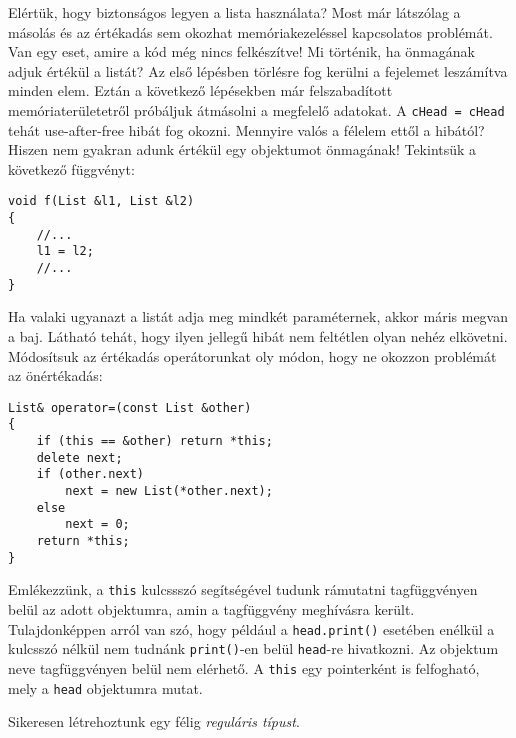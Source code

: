 \documentclass[a4paper,11.5pt,table]{article}
\begin{document}
	Elértük, hogy biztonságos legyen a lista használata? Most már látszólag a másolás és az értékadás sem okozhat memóriakezeléssel kapcsolatos problémát. Van egy eset, amire a kód még nincs felkészítve! Mi történik, ha önmagának adjuk értékül a listát? Az első lépésben törlésre fog kerülni a fejelemet leszámítva minden elem. Eztán a következő lépésekben már felszabadított memóriaterületetről próbáljuk átmásolni a megfelelő adatokat. A \texttt{cHead = cHead} tehát use-after-free hibát fog okozni. Mennyire valós a félelem ettől a hibától? Hiszen nem gyakran adunk értékül egy objektumot önmagának! Tekintsük a következő függvényt:
	\begin{lstlisting}
void f(List &l1, List &l2)
{
	//...
	l1 = l2;
	//...
}
	\end{lstlisting}
	Ha valaki ugyanazt a listát adja meg mindkét paraméternek, akkor máris megvan a baj. Látható tehát, hogy ilyen jellegű hibát nem feltétlen olyan nehéz elkövetni.  Módosítsuk az értékadás operátorunkat oly módon, hogy ne okozzon problémát az önértékadás:
\begin{lstlisting}
List& operator=(const List &other)
{
	if (this == &other) return *this;
	delete next;
	if (other.next)
		next = new List(*other.next);
	else
		next = 0;
	return *this;
}
\end{lstlisting}
  Emlékezzünk, a \texttt{this} kulcssszó segítségével tudunk rámutatni tagfüggvényen belül az adott objektumra, amin a tagfüggvény meghívásra került. Tulajdonképpen arról van szó, hogy például a \texttt{head.print()} esetében enélkül a kulcsszó nélkül nem tudnánk \texttt{print()}-en belül \texttt{head}-re hivatkozni. Az objektum neve tagfüggvényen belül nem elérhető. A \texttt{this} egy pointerként is felfogható, mely a \texttt{head} objektumra mutat.
	\medskip

	Sikeresen létrehoztunk egy félig \textit{reguláris típust}.
	\medskip
	
\end{document}
